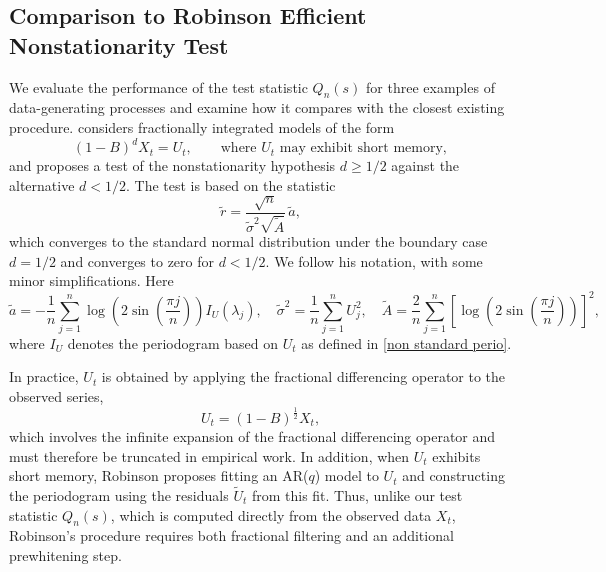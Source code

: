 \documentclass[10pt,a4paper]{amsart}
\numberwithin{equation}{section}
\begin{document}
\subsection{Comparison to Robinson Efficient Nonstationarity Test}\label{Robinson method}

We evaluate the performance of the test statistic $Q_n(s)$ for three examples of data-generating processes and examine how it compares with the closest existing procedure.
\cite{Robinson, Robinson2003} considers fractionally integrated models of the form
\[
(1-B)^dX_t=U_t,
\qquad \text{where } U_t \text{ may exhibit short memory},
\]
and proposes a test of the nonstationarity hypothesis \(d\ge 1/2\) against the alternative \(d<1/2\). The test is based on the statistic
\[
\tilde r=\frac{\sqrt{n}}{\tilde\sigma^2\sqrt{\tilde A}}\,\tilde a,
\]
which converges to the standard normal distribution under the boundary case \(d=1/2\) and converges to zero for $d<1/2$. We follow his notation, with some minor simplifications. Here
\[
\tilde a=-\frac{1}{n}\sum_{j=1}^n 
\log\!\left(2\sin\!\left(\frac{\pi j}{n}\right)\right)
I_U(\lambda_j),\quad
\tilde\sigma^2=\frac{1}{n}\sum_{j=1}^nU^2_j,
\quad
\tilde A=\frac{2}{n}\sum_{j=1}^n
\left[
\log\!\left(2\sin\!\left(\frac{\pi j}{n}\right)\right)
\right]^2,
\]
where \(I_U\) denotes the periodogram based on \(U_t\) as defined in \eqref{non standard perio}.

In practice, \(U_t\) is obtained by applying the fractional differencing operator to the observed series,
\[
U_t=(1-B)^\frac{1}{2}X_t,
\]
which involves the infinite expansion of the fractional differencing operator and must therefore be truncated in empirical work. In addition, when \(U_t\) exhibits short memory, Robinson proposes fitting an AR(\(q\)) model to \(U_t\) and constructing the periodogram using the residuals \(\tilde U_t\) from this fit. Thus, unlike our test statistic \(Q_n(s)\), which is computed directly from the observed data \(X_t\), Robinson's procedure requires both fractional filtering and an additional prewhitening step.
\end{document}
